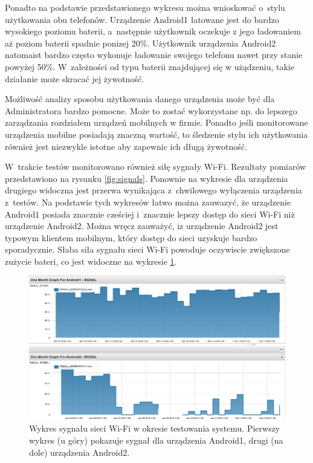Ponadto na podstawie przedstawionego wykresu można wnioskować o~stylu
użytkowania obu telefonów. Urządzenie Android1 łatowane jest do bardzo
wysokiego poziomu baterii, a~następnie użytkownik oczekuje z jego
ładowaniem aż poziom baterii spadnie ponizej 20\%. Użytkownik
urządzenia Android2 natomaist bardzo często wykonuje ładowanie swojego
telefonu nawet przy stanie powyżej 50\%. W~zależności od typu baterii
znajdującej się w użądzeniu, takie działanie może skracać jej
żywotność.

Możliwość analizy sposobu użytkowania danego urządzenia może być dla
Administratora bardzo pomocne. Może to zostać wykorzystane np. do
lepszego zarządzania rozdziałem urządzeń mobilnych w firmie. Ponadto
jeśli monitorowane urządzenia mobilne posiadają znaczną wartość, to
śledzenie stylu ich użytkowania również jest niezwykle istotne aby
zapewnic ich długą żywotność.

W~trakcie testów monitorowano również siłę sygnały Wi-Fi. Rezultaty
pomiarów przedstawiono na rysunku \ref{fig:signals}. Ponownie na
wykresie dla urządzenia drugiego widoczna jest przerwa wynikająca
z~chwilowego wyłączenia urządzenia z~testów. Na podstawie tych
wykresów łatwo można zauwazyć, że urządzenie Android1 posiada znacznie
cześciej i~znacznie lepszy dostęp do sieci Wi-Fi niż urządzenie
Android2. Można wręcz zauważyć, iz urządzenie Android2 jest typowym
klientem mobilnym, który dostęp do sieci uzyskuje bardzo
sporadycznie. Słaba siła sygnału sieci Wi-Fi powoduje oczywiscie
zwiększone zużycie bateri, co jest widoczne na wykresie
\ref{fig:baterie}.

\begin{figure}[ht]
  \caption{Wykres sygnału sieci Wi-Fi w okresie testowania
    systemu. Pierwszy wykres (u góry) pokazuje sygnał dla urządzenia
    Android1, drugi (na dole) urządzenia Android2.}
  \label{fig:baterie}
  \centering
\includegraphics[width=1\textwidth]{img/wifi.png}
\end{figure}

